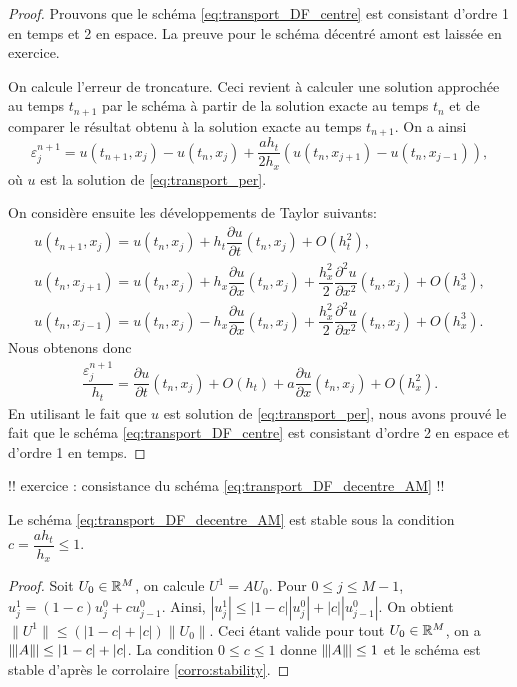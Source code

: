 \documentclass[12pt,a4paper,twoside]{article}
\begin{document}
\begin{proof}
  Prouvons que le sch\'ema \eqref{eq:transport_DF_centre} est consistant
  d'ordre 1 en temps et 2 en espace.
  La preuve pour le sch\'ema d\'ecentr\'e amont est laiss\'ee en exercice.

  On calcule l'erreur de troncature. Ceci revient \`a 
  calculer une solution approch\'ee au temps $t_{n+1}$ par le sch\'ema \`a partir
  de la solution exacte au temps $t_n$ et de comparer le r\'esultat
  obtenu \`a la solution exacte au temps $t_{n+1}$.
  On a ainsi
  \[
    \varepsilon_j^{n+1} = u(t_{n+1},x_j) - u(t_n,x_j)
    + \dfrac{a h_t}{2 h_x} (u(t_n, x_{j+1}) - u(t_n, x_{j-1})) ,
  \]
  o\`u $u$ est la solution de \eqref{eq:transport_per}.

  On consid\`ere ensuite les d\'eveloppements de Taylor suivants:
  \begin{align*}
    u(t_{n+1} , x_j) = u(t_n , x_j) + h_t \dfrac{\partial u}{\partial t} (t_n , x_j)
    + O(h_t^2) ,
    \\
    u(t_n , x_{j+1} ) = u(t_n , x_{j} ) + h_x \dfrac{\partial u}{\partial x}(t_n, x_j)
    + \dfrac{h_x^2}{2} \dfrac{\partial^2 u}{\partial x^2}(t_n, x_j)
    + O(h_x^3) ,
    \\
    u(t_{n} , x_{j-1} ) = u(t_n , x_{j} ) - h_x \dfrac{\partial u}{\partial x}(t_n, x_j)
    + \dfrac{h_x^2}{2} \dfrac{\partial^2 u}{\partial x^2}(t_n, x_j)
    + O(h_x^3) .
  \end{align*}
  Nous obtenons donc
  \begin{align*}
    \dfrac{\varepsilon_j^{n+1}}{h_t} = \dfrac{\partial u}{\partial t}(t_n, x_j)
    + O (h_t) + a \dfrac{\partial u}{\partial x}(t_n, x_j) + O (h_x^2) .
  \end{align*}
  En utilisant le fait que $u$ est solution de \eqref{eq:transport_per},
  nous avons prouv\'e le fait que le sch\'ema \eqref{eq:transport_DF_centre}
  est consistant d'ordre 2 en espace et d'ordre 1 en temps.
\end{proof}

!! exercice : consistance du sch\'ema \eqref{eq:transport_DF_decentre_AM} !!


\begin{proposition}
  Le sch\'ema \eqref{eq:transport_DF_decentre_AM} est stable
  sous la condition $c = \dfrac{a h_t}{h_x} \leq 1$.
\end{proposition}
\begin{proof}
  Soit $U_0 \in \mathbb{R}^M$, on calcule $U^1 = A U_0$.
  Pour $0 \leq j \leq M-1$, 
  $u_j^1 = (1-c) u_j^0 + c u_{j-1}^0$.
  Ainsi, $|u_j^1| \leq |1-c| | u_j^0 | + | c | | u_{j-1}^0 |$.
  On obtient $\| U^1 \| \leq (|1-c| + |c|) \| U_0 \|$.
  Ceci \'etant valide pour tout $U_0 \in \mathbb{R}^M$, on a $\|\!\;\!| A \|\!\;\!| \leq |1-c| + |c|$.
  La condition $0 \leq c \leq 1$ donne $\|\!\;\!| A \|\!\;\!| \leq 1$ et le sch\'ema est stable 
  d'apr\`es le corrolaire \ref{corro:stability}.
\end{proof}
\end{document}
